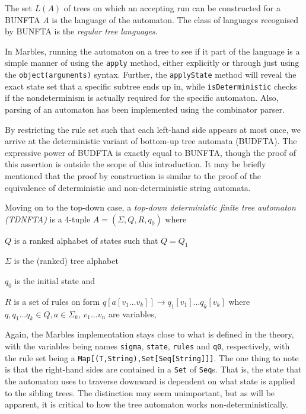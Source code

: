 The set $L(A)$ of trees on which an accepting run can be constructed for a
BUNFTA $A$ is the language of the automaton. The class of languages
recognised by BUNFTA is the \emph{regular tree languages}.

In Marbles, running the automaton on a tree to see if it part of the
language is a simple manner of using the \texttt{apply} method, either
explicitly or through just using the \texttt{object(arguments)} syntax.
Further, the \texttt{applyState} method will reveal the exact state set
that a specific subtree ends up in, while \texttt{isDeterministic} checks
if the nondeterminism is actually required for the specific automaton.
Also, parsing of an automaton has been implemented using the combinator
parser.

By restricting the rule set such that each left-hand side appears at most
once, we arrive at the deterministic variant of bottom-up tree automata
(BUDFTA). The expressive power of BUDFTA is exactly equal to BUNFTA, though
the proof of this assertion is outside the scope of this introduction. It
may be briefly mentioned that the proof by construction is similar to the
proof of the equivalence of deterministic and non-deterministic string
automata.

Moving on to the top-down case, a \emph{top-down deterministic finite tree
automaton (TDNFTA)} is a 4-tuple $A = (\Sigma, Q, R, q_0)$ where
\begin{compactitem}
\item $Q$ is a ranked alphabet of states such that $Q = Q_1$
\item $\Sigma$ is the (ranked) tree alphabet
\item $q_0$ is the initial state and 
\item $R$ is a set of rules on form
$q[a[v_1 \ldots v_k]] \rightarrow q_1[v_1] \ldots  q_k[v_k]$
where $q, q_1 \ldots q_k \in Q, a \in \Sigma_k$, $v_1 \ldots v_n$
are variables,
\end{compactitem}
\vspace{0.5cm}

Again, the Marbles implementation stays close to what is defined in the
theory, with the variables being names \texttt{sigma}, \texttt{state},
\texttt{rules} and \texttt{q0}, respectively, with the rule set being a
\texttt{Map[(T,String),Set[Seq[String]]]}. The one thing to note is that
the right-hand sides are contained in a \texttt{Set} of \texttt{Seq}s. That
is, the state that the automaton uses to traverse downward is dependent on
what state is applied to the sibling trees. The distinction may seem
unimportant, but as will be apparent, it is critical to how the tree
automaton works non-deterministically.

